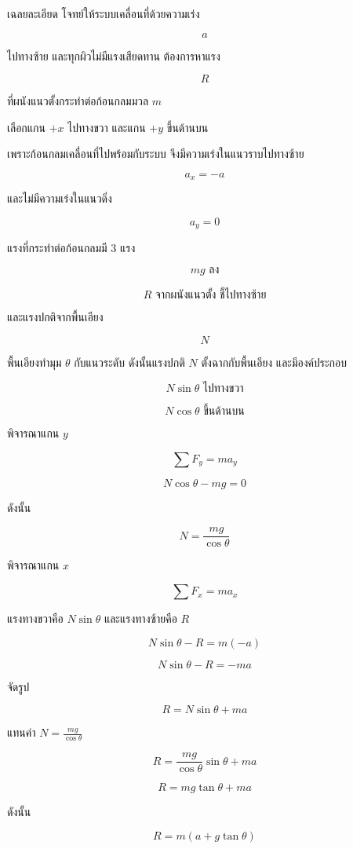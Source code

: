 \begin{examplebox}{เฉลยละเอียด}
โจทย์ให้ระบบเคลื่อนที่ด้วยความเร่ง

\[
a
\]

ไปทางซ้าย และทุกผิวไม่มีแรงเสียดทาน ต้องการหาแรง

\[
R
\]

ที่ผนังแนวตั้งกระทำต่อก้อนกลมมวล $m$

เลือกแกน $+x$ ไปทางขวา และแกน $+y$ ขึ้นด้านบน

เพราะก้อนกลมเคลื่อนที่ไปพร้อมกับระบบ จึงมีความเร่งในแนวราบไปทางซ้าย

\[
a_x=-a
\]

และไม่มีความเร่งในแนวดิ่ง

\[
a_y=0
\]

แรงที่กระทำต่อก้อนกลมมี 3 แรง

\[
mg \text{ ลง}
\]

\[
R \text{ จากผนังแนวตั้ง ชี้ไปทางซ้าย}
\]

และแรงปกติจากพื้นเอียง

\[
N
\]

พื้นเอียงทำมุม $\theta$ กับแนวระดับ ดังนั้นแรงปกติ $N$ ตั้งฉากกับพื้นเอียง และมีองค์ประกอบ

\[
N\sin\theta \text{ ไปทางขวา}
\]

\[
N\cos\theta \text{ ขึ้นด้านบน}
\]

พิจารณาแกน $y$

\[
\sum F_y=ma_y
\]

\[
N\cos\theta-mg=0
\]

ดังนั้น

\[
N=\frac{mg}{\cos\theta}
\]

พิจารณาแกน $x$

\[
\sum F_x=ma_x
\]

แรงทางขวาคือ $N\sin\theta$ และแรงทางซ้ายคือ $R$

\[
N\sin\theta-R=m(-a)
\]

\[
N\sin\theta-R=-ma
\]

จัดรูป

\[
R=N\sin\theta+ma
\]

แทนค่า $N=\frac{mg}{\cos\theta}$

\[
R=\frac{mg}{\cos\theta}\sin\theta+ma
\]

\[
R=mg\tan\theta+ma
\]

ดังนั้น

\[
\boxed{R=m(a+g\tan\theta)}
\]
\end{examplebox}

